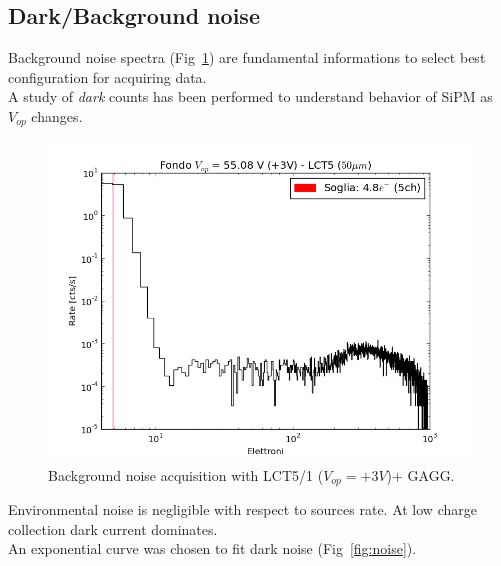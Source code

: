 \documentclass[10pt,a4paper, openany]{book}
\begin{document}
\subsection{Dark/Background noise}
Background noise spectra (Fig~\ref{fig:fondo}) are fundamental informations to select best configuration for acquiring data.\\
A study of \emph{dark} counts has been performed to understand behavior of SiPM as $V_{op}$ changes.

\begin{figure}[!h]
\begin{center}
\includegraphics[scale=0.5]{imm/fondo.png}
\end{center}
\caption{Background noise acquisition with LCT5/1 ($V_{op}=+3V$)+ GAGG.}
\label{fig:fondo}
\end{figure}

Environmental noise is negligible with respect to sources rate. At low charge collection dark current dominates.\\
An exponential curve was chosen to fit dark noise (Fig~\ref{fig:noise}). 
\end{document}
